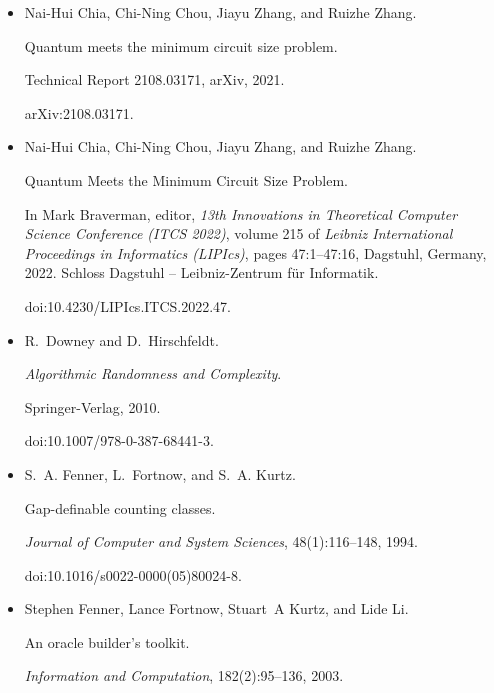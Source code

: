 \begin{itemize}
\item[] 
[15]

Nai-Hui Chia, Chi-Ning Chou, Jiayu Zhang, and Ruizhe Zhang.


Quantum meets the minimum circuit size problem.


Technical Report 2108.03171, arXiv, 2021.


arXiv:2108.03171.





\item[] 
[16]

Nai-Hui Chia, Chi-Ning Chou, Jiayu Zhang, and Ruizhe Zhang.


Quantum Meets the Minimum Circuit Size Problem.


In Mark Braverman, editor, \emph{13th Innovations in Theoretical
Computer Science Conference (ITCS 2022)}, volume 215 of \emph{Leibniz
International Proceedings in Informatics (LIPIcs)}, pages 47:1–47:16,
Dagstuhl, Germany, 2022. Schloss Dagstuhl – Leibniz-Zentrum für
Informatik.


doi:10.4230/LIPIcs.ITCS.2022.47.





\item[] 
[17]

R. Downey and D. Hirschfeldt.


\emph{Algorithmic Randomness and Complexity}.


Springer-Verlag, 2010.


doi:10.1007/978-0-387-68441-3.





\item[] 
[18]

S. A. Fenner, L. Fortnow, and S. A. Kurtz.


Gap-definable counting classes.


\emph{Journal of Computer and System Sciences}, 48(1):116–148, 1994.


doi:10.1016/s0022-0000(05)80024-8.





\item[] 
[19]

Stephen Fenner, Lance Fortnow, Stuart A Kurtz, and Lide Li.


An oracle builder’s toolkit.


\emph{Information and Computation}, 182(2):95–136, 2003.



\end{itemize}
